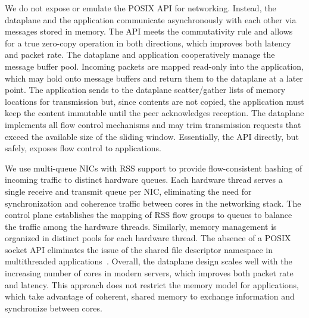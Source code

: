  We do
not expose or emulate the POSIX API for networking.  Instead, the
dataplane and the application communicate asynchronously with each
other via messages stored in
memory.%
The API meets the commutativity rule and allows for a true zero-copy
operation in both directions, which improves both latency and packet
rate. The dataplane and application cooperatively manage the message
buffer pool. Incoming packets are mapped read-only into the
application, which may hold onto message buffers and return them to
the dataplane at a later point.  The application sends to the
dataplane scatter/gather lists of memory locations for transmission
but, since contents are not copied, the application must keep the
content immutable until the peer acknowledges reception. The dataplane
implements all flow control mechanisms and may trim transmission
requests that exceed the available size of the sliding window.
Essentially, the API directly, but safely, exposes flow control to
applications.

 We use
multi-queue NICs with RSS support to provide flow-consistent hashing
of incoming traffic to distinct hardware queues. Each hardware
thread serves a single receive and transmit queue per NIC, eliminating
the need for synchronization and
coherence traffic between cores in the networking stack.  The control
plane establishes the mapping of RSS flow groups to queues to balance
the traffic among the hardware threads.  Similarly, memory management
is organized in distinct pools for each hardware thread. The absence
of a POSIX socket API eliminates the issue of the shared file
descriptor namespace in multithreaded
applications~\cite{DBLP:conf/sosp/ClementsKZMK13}. Overall, the \ix
dataplane design scales well with the increasing number of cores in
modern servers, which improves both packet rate and latency. This
approach does not restrict the memory model for applications, which
take advantage of coherent, shared memory to exchange information and
synchronize between cores.




